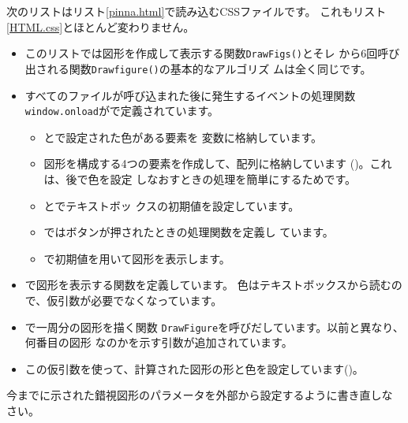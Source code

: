 次のリストはリスト\ref{pinna.html}で読み込むCSSファイルです。
これもリスト\ref{HTML.css}とほとんど変わりません。
\begin{itemize}
 \item このリストでは図形を作成して表示する関数\texttt{DrawFigs()}とそレ
       から6回呼び出される関数\texttt{Drawfigure()}の基本的なアルゴリズ
       ムは全く同じです。
 \item すべてのファイルが呼び込まれた後に発生するイベントの処理関数
       \texttt{window.onload}がで定義されています。
       \begin{itemize}
        \item {}とで設定された色がある要素を
              変数に格納しています。
        \item 図形を構成する4つの要素を作成して、配列に格納しています
              ()。これは、後で色を設定
              しなおすときの処理を簡単にするためです。
        \item {}とでテキストボッ
              クスの初期値を設定しています。
        \item {}ではボタンが押されたときの処理関数を定義し
              ています。
        \item {}で初期値を用いて図形を表示します。
       \end{itemize}
 \item {}で図形を表示する関数を定義しています。
       色はテキストボックスから読むので、仮引数が必要でなくなっています。
 \item {}で一周分の図形を描く関数
       \texttt{DrawFigure}を呼びだしています。以前と異なり、何番目の図形
       なのかを示す引数が追加されています。
 \item この仮引数を使って、計算された図形の形と色を設定しています()。
\end{itemize}
 \begin{Problem}
 今までに示された錯視図形のパラメータを外部から設定するように書き直しな
 さい。
 \end{Problem}